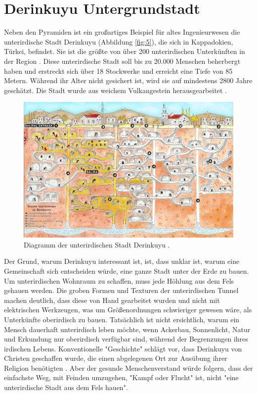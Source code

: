 \documentclass[10pt,twocolumn,letterpaper]{article}
\begin{document}
\section{Derinkuyu Untergrundstadt}

Neben den Pyramiden ist ein großartiges Beispiel für altes Ingenieurwesen die unterirdische Stadt Derinkuyu (Abbildung \ref{fig:5}), die sich in Kappadokien, Türkei, befindet. Sie ist die größte von über 200 unterirdischen Unterkünften in der Region \cite{54}. Diese unterirdische Stadt soll bis zu 20.000 Menschen beherbergt haben und erstreckt sich über 18 Stockwerke und erreicht eine Tiefe von 85 Metern. Während ihr Alter nicht gesichert ist, wird sie auf mindestens 2800 Jahre geschätzt. Die Stadt wurde aus weichem Vulkangestein herausgearbeitet \cite{52, 53}.

\begin{figure}[b]
\begin{center}
   \includegraphics[width=1\linewidth]{derinkuyu.jpeg}
\end{center}
   \caption{Diagramm der unterirdischen Stadt Derinkuyu \cite{56}.}
\label{fig:5}
\label{fig:onecol}
\end{figure}
Der Grund, warum Derinkuyu interessant ist, ist, dass unklar ist, warum eine Gemeinschaft sich entscheiden würde, eine ganze Stadt unter der Erde zu bauen. Um unterirdischen Wohnraum zu schaffen, muss jede Höhlung aus dem Fels gehauen werden. Die groben Formen und Texturen der unterirdischen Tunnel machen deutlich, dass diese von Hand gearbeitet wurden und nicht mit elektrischen Werkzeugen, was um Größenordnungen schwieriger gewesen wäre, als Unterkünfte oberirdisch zu bauen. Tatsächlich ist nicht ersichtlich, warum ein Mensch dauerhaft unterirdisch leben möchte, wenn Ackerbau, Sonnenlicht, Natur und Erkundung nur oberirdisch verfügbar sind, während der Begrenzungen ihres irdischen Lebens. Konventionelle "Geschichte" schlägt vor, dass Derinkuyu von Christen geschaffen wurde, die einen abgelegenen Ort zur Ausübung ihrer Religion benötigten \cite{53}. Aber der gesunde Menschenverstand würde folgern, dass der einfachste Weg, mit Feinden umzugehen, "Kampf oder Flucht" ist, nicht "eine unterirdische Stadt aus dem Fels hauen".
\end{document}
